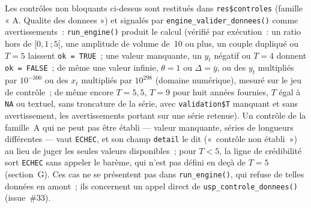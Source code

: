 \documentclass[a4paper,11pt]{article}
\newcommand{\code}[1]{\texttt{\small #1}}
\begin{document}
Les contrôles non bloquants ci-dessus sont restitués dans \code{res\$controles}
(famille « A. Qualite des donnees ») et signalés par \code{engine\_valider\_donnees()}
comme avertissements~: \code{run\_engine()} produit le calcul (vérifié par exécution~:
un ratio hors de $[0{,}1\,;5[$, une amplitude de volume de~10 ou plus, un couple dupliqué ou
$T = 5$ laissent \code{ok = TRUE}~; une valeur manquante, un $y_t$ négatif ou $T = 4$
donnent \code{ok = FALSE}~; de même une valeur infinie, $\theta = 1$ ou
$\Delta = \bar y$, ou des $y_t$ multipliés par $10^{-300}$ ou des $x_t$ multipliés par $10^{298}$
(domaine numérique), mesuré sur le jeu de contrôle~; de même encore $T = 5{,}5$, $T = 9$ pour
huit années fournies, $T$ égal à \code{NA} ou textuel, sans troncature de la série, avec
\code{validation\$T} manquant et sans avertissement, les avertissements portant sur une série
retenue). Un contrôle de la famille~A qui ne peut pas
être établi --- valeur manquante, séries de longueurs différentes --- vaut \code{ECHEC}, et son
champ \code{detail} le dit («~contrôle non établi~») au lieu de juger les seules valeurs
disponibles~; pour $T < 5$, la ligne de crédibilité sort \code{ECHEC} sans appeler le barème,
qui n'est pas défini en deçà de $T = 5$ (section~G). Ces cas ne se présentent pas dans \code{run\_engine()}, qui
refuse de telles données en amont~; ils concernent un appel direct de
\code{usp\_controle\_donnees()} (issue~\#33).
\end{document}

